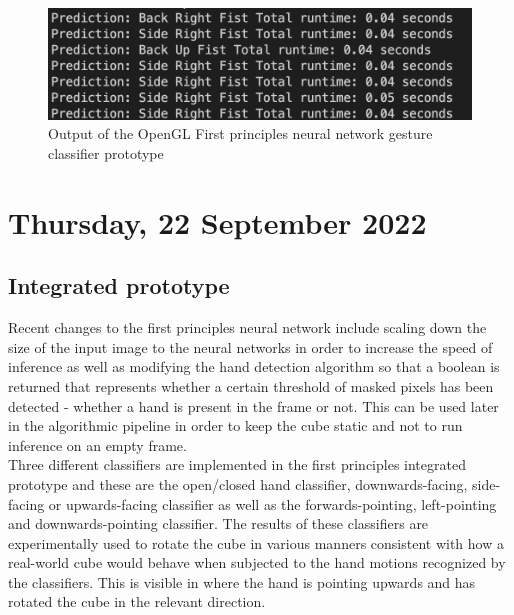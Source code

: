 \begin{figure}[h]
    \centering
    \includegraphics[width=0.7\linewidth]{figures/smaller_image_prediction_time.png}
    \caption{Output of the OpenGL First principles neural network gesture classifier prototype}
    \label{fig:smaller_image_prediction_time}
\end{figure}

\section[2022/09/22]{Thursday, 22 September 2022}

\subsection{Integrated prototype}

Recent changes to the first principles neural network include scaling down the size of the input image to the neural networks in order to increase the speed of inference as well as modifying the hand detection algorithm so that a boolean is returned that represents whether a certain threshold of masked pixels has been detected - whether a hand is present in the frame or not. This can be used later in the algorithmic pipeline in order to keep the cube static and not to run inference on an empty frame. \\

Three different classifiers are implemented in the first principles integrated prototype and these are the open/closed hand classifier, downwards-facing, side-facing or upwards-facing classifier as well as the forwards-pointing, left-pointing and downwards-pointing classifier. The results of these classifiers are experimentally used to rotate the cube in various manners consistent with how a real-world cube would behave when subjected to the hand motions recognized by the classifiers. This is visible in  where the hand is pointing upwards and has rotated the cube in the relevant direction.

